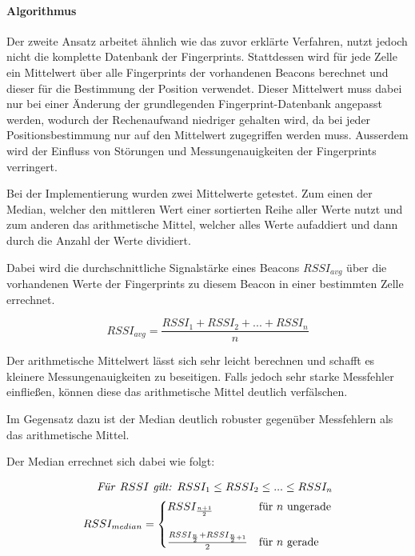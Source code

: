 \paragraph{Algorithmus}
\label{sec:implementation:fingerprinting:positioning:avg:algorithm}

Der zweite Ansatz arbeitet ähnlich wie das zuvor erklärte Verfahren, nutzt jedoch nicht die komplette Datenbank der Fingerprints. 
Stattdessen wird für jede Zelle ein Mittelwert über alle Fingerprints der vorhandenen Beacons berechnet und dieser für die Bestimmung der Position verwendet.
Dieser Mittelwert muss dabei nur bei einer Änderung der grundlegenden Fingerprint-Datenbank angepasst werden, wodurch der Rechenaufwand niedriger gehalten wird, da bei jeder Positionsbestimmung nur auf den Mittelwert zugegriffen werden muss.
Ausserdem wird der Einfluss von Störungen und Messungenauigkeiten der Fingerprints verringert.

Bei der Implementierung wurden zwei Mittelwerte getestet. Zum einen der Median, welcher den mittleren Wert einer sortierten Reihe aller Werte nutzt und zum anderen das arithmetische Mittel, welcher alles Werte aufaddiert und dann durch die Anzahl der Werte dividiert.

Dabei wird die durchschnittliche Signalstärke eines Beacons $RSSI_{avg}$ über die vorhandenen Werte der Fingerprints zu diesem Beacon in einer bestimmten Zelle errechnet.

\begin{equation}
	RSSI_{avg} = \frac{RSSI_{1} + RSSI_{2} + ... + RSSI_{n}}{n}
\end{equation}

Der arithmetische Mittelwert lässt sich sehr leicht berechnen und schafft es kleinere Messungenauigkeiten zu beseitigen. Falls jedoch sehr starke Messfehler einfließen, können diese das arithmetische Mittel deutlich verfälschen.

Im Gegensatz dazu ist der Median deutlich robuster gegenüber Messfehlern als das arithmetische Mittel.

Der Median errechnet sich dabei wie folgt: 

\begin{equation}
	\begin{split}
	\text{\emph{Für }}RSSI \text{\emph{ gilt: }} RSSI_{1} \leq RSSI_{2} \leq ... \leq RSSI_{n} \\
	RSSI_{median}=\begin{cases}
	RSSI_{\frac{n+1}{2}} & \text{für } n \text{ ungerade}\\ \\
	\frac{RSSI_{\frac{n}{2}} + RSSI_{\frac{n}{2}+1}}{2} & \text{für } n \text{ gerade} \\
	\end{cases}
	\end{split}
\end{equation}

